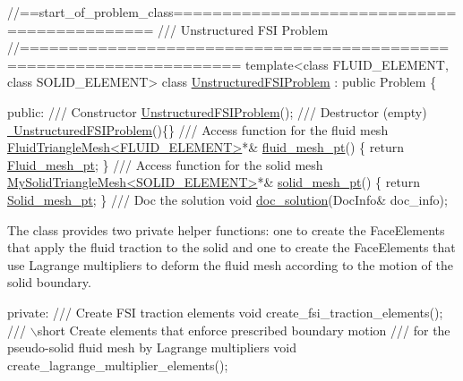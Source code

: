  
\begin{DoxyCodeInclude}
\textcolor{comment}{//==start\_of\_problem\_class============================================}
\textcolor{comment}{/// Unstructured FSI Problem}
\textcolor{comment}{}\textcolor{comment}{//====================================================================}
\textcolor{keyword}{template}<\textcolor{keyword}{class} FLUID\_ELEMENT, \textcolor{keyword}{class} SOLID\_ELEMENT>
\textcolor{keyword}{class }\hyperlink{classUnstructuredFSIProblem}{UnstructuredFSIProblem} : \textcolor{keyword}{public} Problem
\{

\textcolor{keyword}{public}:
\textcolor{comment}{}
\textcolor{comment}{ /// Constructor}
\textcolor{comment}{} \hyperlink{classUnstructuredFSIProblem_a6a31fd839e0215ef1312942cf7284bd2}{UnstructuredFSIProblem}();
\textcolor{comment}{}
\textcolor{comment}{ /// Destructor (empty)}
\textcolor{comment}{} \hyperlink{classUnstructuredFSIProblem_a976a81e0dee902f6713bd8ca4d79d000}{~UnstructuredFSIProblem}()\{\}
\textcolor{comment}{}
\textcolor{comment}{ /// Access function for the fluid mesh}
\textcolor{comment}{} \hyperlink{classFluidTriangleMesh}{FluidTriangleMesh<FLUID\_ELEMENT>}*& 
      \hyperlink{classUnstructuredFSIProblem_afe86a739cadf57036a0bf351ed9bc1a9}{fluid\_mesh\_pt}() 
  \{
   \textcolor{keywordflow}{return} \hyperlink{classUnstructuredFSIProblem_a33c3b4cd9923f8b25368ff20e4810b2c}{Fluid\_mesh\_pt};
  \}
\textcolor{comment}{}
\textcolor{comment}{ /// Access function for the solid mesh}
\textcolor{comment}{} \hyperlink{classMySolidTriangleMesh}{MySolidTriangleMesh<SOLID\_ELEMENT>}*& 
      \hyperlink{classUnstructuredFSIProblem_ad1430c627842b8ea0a373adcf571647f}{solid\_mesh\_pt}() 
  \{
   \textcolor{keywordflow}{return} \hyperlink{classUnstructuredFSIProblem_aeb164665366e237ca311e448466d7c9d}{Solid\_mesh\_pt};
  \}
\textcolor{comment}{}
\textcolor{comment}{ /// Doc the solution}
\textcolor{comment}{} \textcolor{keywordtype}{void} \hyperlink{classUnstructuredFSIProblem_a15f581318b505de07f50bd570da8c8d0}{doc\_solution}(DocInfo& doc\_info);

\end{DoxyCodeInclude}


The class provides two private helper functions\+: one to create the {\ttfamily Face\+Elements} that apply the fluid traction to the solid and one to create the {\ttfamily Face\+Elements} that use Lagrange multipliers to deform the fluid mesh according to the motion of the solid boundary.


\begin{DoxyCodeInclude}

\textcolor{keyword}{private}:
\textcolor{comment}{}
\textcolor{comment}{ /// Create FSI traction elements}
\textcolor{comment}{} \textcolor{keywordtype}{void} create\_fsi\_traction\_elements();
\textcolor{comment}{}
\textcolor{comment}{ /// \(\backslash\)short Create elements that enforce prescribed boundary motion}
\textcolor{comment}{ /// for the pseudo-solid fluid mesh by Lagrange multipliers}
\textcolor{comment}{} \textcolor{keywordtype}{void} create\_lagrange\_multiplier\_elements();

\end{DoxyCodeInclude}


